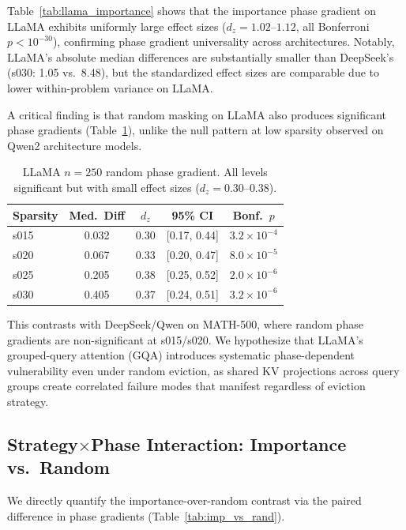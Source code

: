 \documentclass[11pt,a4paper]{article}
\begin{document}
Table~\ref{tab:llama_importance} shows that the importance phase gradient on LLaMA exhibits uniformly large effect sizes ($d_z = 1.02$--$1.12$, all Bonferroni $p < 10^{-30}$), confirming phase gradient universality across architectures. Notably, LLaMA's absolute median differences are substantially smaller than DeepSeek's (s030: 1.05 vs.\ 8.48), but the standardized effect sizes are comparable due to lower within-problem variance on LLaMA.

A critical finding is that random masking on LLaMA also produces significant phase gradients (Table~\ref{tab:llama_random}), unlike the null pattern at low sparsity observed on Qwen2 architecture models.

\begin{table}[t]
\centering
\small
\caption{LLaMA $n=250$ random phase gradient. All levels significant but with small effect sizes ($d_z = 0.30$--$0.38$).}
\label{tab:llama_random}
\begin{tabular}{lcccc}
\toprule
Sparsity & Med.\ Diff & $d_z$ & 95\% CI & Bonf.\ $p$ \\
\midrule
s015 & 0.032 & 0.30 & [0.17, 0.44] & $3.2 \times 10^{-4}$ \\
s020 & 0.067 & 0.33 & [0.20, 0.47] & $8.0 \times 10^{-5}$ \\
s025 & 0.205 & 0.38 & [0.25, 0.52] & $2.0 \times 10^{-6}$ \\
s030 & 0.405 & 0.37 & [0.24, 0.51] & $3.2 \times 10^{-6}$ \\
\bottomrule
\end{tabular}
\end{table}

This contrasts with DeepSeek/Qwen on MATH-500, where random phase gradients are non-significant at s015/s020. We hypothesize that LLaMA's grouped-query attention (GQA) introduces systematic phase-dependent vulnerability even under random eviction, as shared KV projections across query groups create correlated failure modes that manifest regardless of eviction strategy.

\subsection{Strategy$\times$Phase Interaction: Importance vs.\ Random}
\label{sec:interaction}

We directly quantify the importance-over-random contrast via the paired difference in phase gradients (Table~\ref{tab:imp_vs_rand}).
\end{document}
